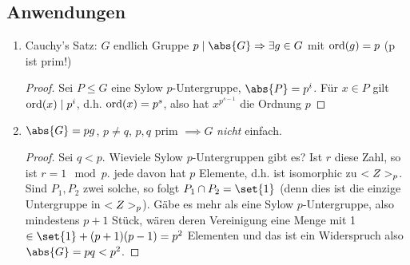 \subsection{Anwendungen}
\begin{enumerate}
	\item Cauchy's Satz: $G$ endlich Gruppe $p \mid \abs{G} \implies \exists g \in G$ mit $\operatorname{ord}(g) = p$ (p ist prim!)
	\begin{proof}
		Sei $P \le G$ eine Sylow $p$-Untergruppe, $\abs{P} = p^i$. Für $x \in P$ gilt $\operatorname{ord}(x) \mid p^{i}$, d.h. $\operatorname{ord}(x) = p^s$, also hat $x^{p^{s-1}}$ die Ordnung $p$
	\end{proof}
	\item $\abs{G} = pg$, $p\neq q$, $p,q$ prim $\implies G$ \emph{nicht} einfach.
	\begin{proof}
		Sei $q < p$. Wieviele Sylow $p$-Untergruppen gibt es? Ist $r$ diese Zahl, so ist $r=1 \mod p$. jede davon hat $p$ Elemente, d.h. ist isomorphic zu $<Z>_p$. Sind $P_1, P_2$ zwei solche, so folgt $P_1 \cap P_2 = \set{1}$ (denn dies ist die einzige Untergruppe in $<Z>_p$). Gäbe es mehr als eine Sylow $p$-Untergruppe, also mindestens $p+1$ Stück, wären deren Vereinigung eine Menge mit 1 $\in \set{1} + (p+1)(p-1) = p^2$ Elementen und das ist ein Widerspruch also $\abs{G} = pq < p^2$.
	\end{proof}
\end{enumerate}